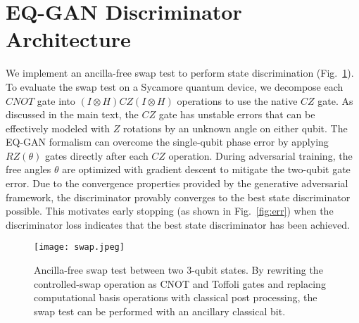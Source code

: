 \documentclass[prl,superscriptaddress,twocolumn]{revtex4}
\theoremstyle{plain}
\theoremstyle{definition}
\begin{document}
\section{EQ-GAN Discriminator Architecture}%
We implement an ancilla-free swap test to perform state discrimination (Fig.~\ref{fig:swap}). To evaluate the swap test on a Sycamore quantum device, we decompose each $CNOT$ gate into $(I \otimes H)CZ(I \otimes H)$ operations to use the native $CZ$ gate. As discussed in the main text, the $CZ$ gate has unstable errors that can be effectively modeled with $Z$ rotations by an unknown angle on either qubit. The EQ-GAN formalism can overcome the single-qubit phase error by applying $RZ(\theta)$ gates directly after each $CZ$ operation. During adversarial training, the free angles $\theta$ are optimized with gradient descent to mitigate the two-qubit gate error. Due to the convergence properties provided by the generative adversarial framework, the discriminator provably converges to the best state discriminator possible. This motivates early stopping (as shown in Fig.~\ref{fig:err}) when the discriminator loss indicates that the best state discriminator has been achieved.

\begin{figure}[h!]
\begin{center}
\texttt{[image: swap.jpeg]}
\caption{Ancilla-free swap test between two 3-qubit states. By rewriting the controlled-swap operation as CNOT and Toffoli gates and replacing computational basis operations with classical post processing, the swap test can be performed with an ancillary classical bit.}
\label{fig:swap}
\end{center}
\end{figure}
\end{document}
